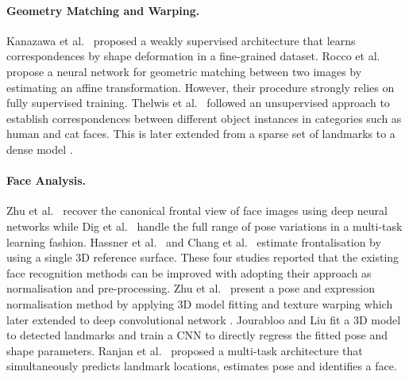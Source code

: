 \documentclass[runningheads]{llncs}
\newcommand{\etal}{{et al.~}}
\begin{document}
\paragraph{Geometry Matching and Warping.}

Kanazawa \etal \cite{kanazawa2016warpnet} proposed a weakly supervised architecture that learns correspondences by shape deformation in a fine-grained dataset. Rocco \etal \cite{rocco2017convolutional} propose a neural network for geometric matching between two images by estimating an affine transformation. However, their procedure strongly relies on fully supervised training. Thelwis \etal \cite{thewlis2017unsupervised} followed an unsupervised approach to establish correspondences between different object instances in categories such as human and cat faces. This is later extended from a sparse set of landmarks to a dense model \cite{thewlis2017unsupervised2}.



\paragraph{Face Analysis.}

Zhu \etal \cite{zhu2014recover} recover the canonical frontal view of face images using deep neural networks while Dig \etal\cite{ding2015multi} handle the full range of pose variations in a multi-task learning fashion. Hassner \etal \cite{hassner2015effective} and Chang \etal \cite{chang2017faceposenet} estimate frontalisation by using a single 3D reference surface. These four studies reported that the existing face recognition methods can be improved with adopting their approach as normalisation and pre-processing. Zhu \etal \cite{zhu2015high} present a pose and expression normalisation method by applying 3D model fitting and texture warping which later extended to deep convolutional network \cite{zhu2016face}.
Jourabloo and Liu \cite{jourabloo2016large} fit a 3D model to detected landmarks and train a CNN to directly regress the fitted pose and shape parameters.
Ranjan \etal \cite{ranjan2017hyperface,ranjan2017all} proposed a multi-task architecture that simultaneously predicts landmark locations, estimates pose and identifies a face.
\end{document}
